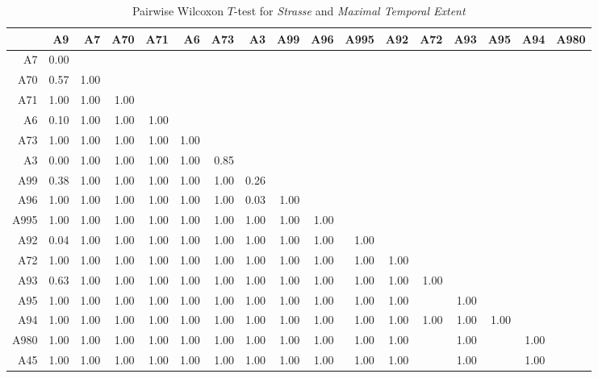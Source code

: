 \begin{table}[ht!]
	\tiny
	\setlength{\tabcolsep}{4pt}
	\centering
  \begin{tabular}{rrrrrrrrrrrrrrrrr}
    \hline
         & A9 & A7 & A70 & A71 & A6 & A73 & A3 & A99 & A96 & A995 & A92 & A72 & A93 & A95 & A94 & A980 \\ 
    \hline
    A7   & 0.00 &  &  &  &  &  &  &  &  &  &  &  &  &  &  &  \\ 
    A70  & 0.57 & 1.00 &  &  &  &  &  &  &  &  &  &  &  &  &  &  \\ 
    A71  & 1.00 & 1.00 & 1.00 &  &  &  &  &  &  &  &  &  &  &  &  &  \\ 
    A6   & 0.10 & 1.00 & 1.00 & 1.00 &  &  &  &  &  &  &  &  &  &  &  &  \\ 
    A73  & 1.00 & 1.00 & 1.00 & 1.00 & 1.00 &  &  &  &  &  &  &  &  &  &  &  \\ 
    A3   & 0.00 & 1.00 & 1.00 & 1.00 & 1.00 & 0.85 &  &  &  &  &  &  &  &  &  &  \\ 
    A99  & 0.38 & 1.00 & 1.00 & 1.00 & 1.00 & 1.00 & 0.26 &  &  &  &  &  &  &  &  &  \\ 
    A96  & 1.00 & 1.00 & 1.00 & 1.00 & 1.00 & 1.00 & 0.03 & 1.00 &  &  &  &  &  &  &  &  \\ 
    A995 & 1.00 & 1.00 & 1.00 & 1.00 & 1.00 & 1.00 & 1.00 & 1.00 & 1.00 &  &  &  &  &  &  &  \\ 
    A92  & 0.04 & 1.00 & 1.00 & 1.00 & 1.00 & 1.00 & 1.00 & 1.00 & 1.00 & 1.00 &  &  &  &  &  &  \\ 
    A72  & 1.00 & 1.00 & 1.00 & 1.00 & 1.00 & 1.00 & 1.00 & 1.00 & 1.00 & 1.00 & 1.00 &  &  &  &  &  \\ 
    A93  & 0.63 & 1.00 & 1.00 & 1.00 & 1.00 & 1.00 & 1.00 & 1.00 & 1.00 & 1.00 & 1.00 & 1.00 &  &  &  &  \\ 
    A95  & 1.00 & 1.00 & 1.00 & 1.00 & 1.00 & 1.00 & 1.00 & 1.00 & 1.00 & 1.00 & 1.00 &  & 1.00 &  &  &  \\ 
    A94  & 1.00 & 1.00 & 1.00 & 1.00 & 1.00 & 1.00 & 1.00 & 1.00 & 1.00 & 1.00 & 1.00 & 1.00 & 1.00 & 1.00 &  &  \\ 
    A980 & 1.00 & 1.00 & 1.00 & 1.00 & 1.00 & 1.00 & 1.00 & 1.00 & 1.00 & 1.00 & 1.00 &  & 1.00 &  & 1.00 &  \\ 
    A45  & 1.00 & 1.00 & 1.00 & 1.00 & 1.00 & 1.00 & 1.00 & 1.00 & 1.00 & 1.00 & 1.00 &  & 1.00 &  & 1.00 &  \\ 
    \hline
  \end{tabular}
	\caption{Pairwise Wilcoxon $T$-test for \textit{Strasse} and \textit{Maximal Temporal Extent}}
	\label{tbl:wilcoxon_baysis_matched_Strasse_TMax}
\end{table}
